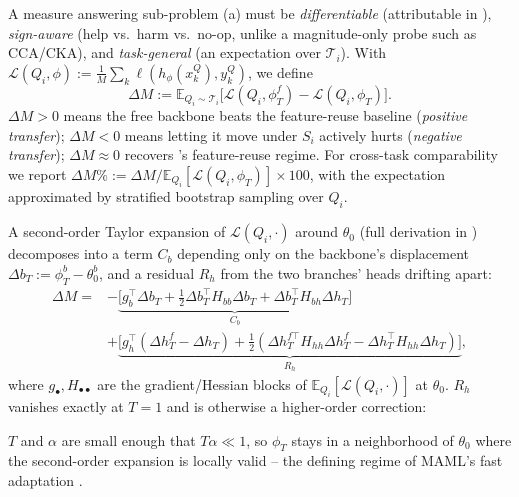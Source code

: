 A measure answering sub-problem (a) must be \emph{differentiable} (attributable in ), \emph{sign-aware} (help vs.\ harm vs.\ no-op, unlike a magnitude-only probe such as CCA/CKA), and \emph{task-general} (an expectation over $\mathcal{T}_i$). With $\mathcal{L}(Q_i,\phi):=\frac{1}{M}\sum_k \ell(h_\phi(x_k^Q),y_k^Q)$, we define
\begin{equation}
    \Delta M := \mathbb{E}_{Q_i\sim\mathcal{T}_i}\!\big[\mathcal{L}(Q_i,\phi_T^{f}) - \mathcal{L}(Q_i,\phi_T)\big].
    \label{eq:adaptation_gain}
\end{equation}
$\Delta M{>}0$ means the free backbone beats the feature-reuse baseline (\emph{positive transfer}); $\Delta M{<}0$ means letting it move under $S_i$ actively hurts (\emph{negative transfer}); $\Delta M{\approx}0$ recovers \citet{raghu2019rapid}'s feature-reuse regime. For cross-task comparability we report $\Delta M\%:=\Delta M/\mathbb{E}_{Q_i}[\mathcal{L}(Q_i,\phi_T)]\times 100$, with the expectation approximated by stratified bootstrap sampling over $Q_i$.

A second-order Taylor expansion of $\mathcal{L}(Q_i,\cdot)$ around $\theta_0$ (full derivation in ) decomposes  into a term $C_b$ depending only on the backbone's displacement $\Delta b_T := \phi_T^b-\theta_0^b$, and a residual $R_h$ from the two branches' heads drifting apart:
\begin{equation}
\begin{split}
    \Delta M = &-\underbrace{\big[g_b^\top\Delta b_T+\tfrac{1}{2}\Delta b_T^\top H_{bb}\Delta b_T+\Delta b_T^\top H_{bh}\Delta h_T\big]}_{C_b}\\
    &+\underbrace{\big[g_h^\top(\Delta h_T^f{-}\Delta h_T)+\tfrac12(\Delta h_T^{f\top} H_{hh} \Delta h_T^f{-}\Delta h_T^\top H_{hh}\Delta h_T)\big]}_{R_h},
\end{split}
\label{eq:decomposition}
\end{equation}
where $g_\bullet,H_{\bullet\bullet}$ are the gradient/Hessian blocks of $\mathbb{E}_{Q_i}[\mathcal{L}(Q_i,\cdot)]$ at $\theta_0$. $R_h$ vanishes exactly at $T{=}1$ and is otherwise a higher-order correction:

\begin{assumption}
\label{asm:fast_adaptation}
$T$ and $\alpha$ are small enough that $T\alpha\ll1$, so $\phi_T$ stays in a neighborhood of $\theta_0$ where the second-order expansion is locally valid \citep{grant2018recasting} -- the defining regime of MAML's fast adaptation \citep{finn2017model}.
\end{assumption}

